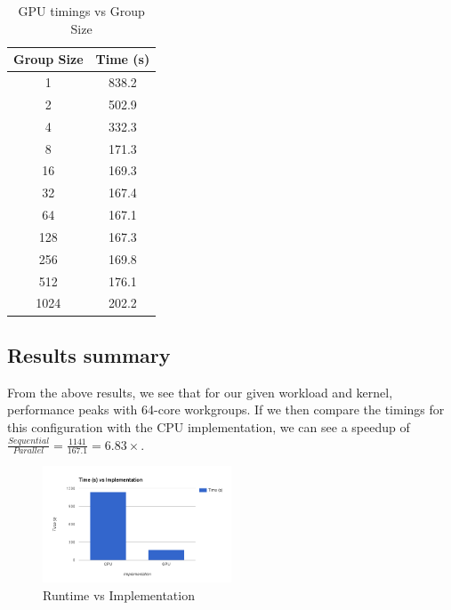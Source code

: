 \documentclass[journal,transmag]{IEEEtran}
\begin{document}
        \begin{table}[h]
            \centering
            \caption{GPU timings vs Group Size}
            \label{GPUvsGroupsSizeTable}
            \begin{tabular}{ c c }
                Group Size & Time (s) \\
                \hline
                \hline
                   1       & 838.2 \\
                   2       & 502.9 \\
                   4       & 332.3 \\
                   8       & 171.3 \\
                  16       & 169.3 \\
                  32       & 167.4 \\
                \hline
                  64       & 167.1 \\
                \hline
                 128       & 167.3 \\
                 256       & 169.8 \\
                 512       & 176.1 \\
                1024       & 202.2 \\
            \end{tabular}
        \end{table}

        \subsection{Results summary}
        From the above results, we see that for our given workload and kernel, performance peaks with 64-core
        workgroups. If we then compare the timings for this configuration with the CPU implementation, we can see a
        speedup of $ \frac{Sequential}{Parallel} = \frac{1141}{167.1} = 6.83\times $.
        \begin{figure}[h]
            \centering
            \includegraphics[width=0.5\textwidth]{report/images/RuntimeVsImplementation.png}
            \caption{Runtime vs Implementation}
        \end{figure}
\end{document}
